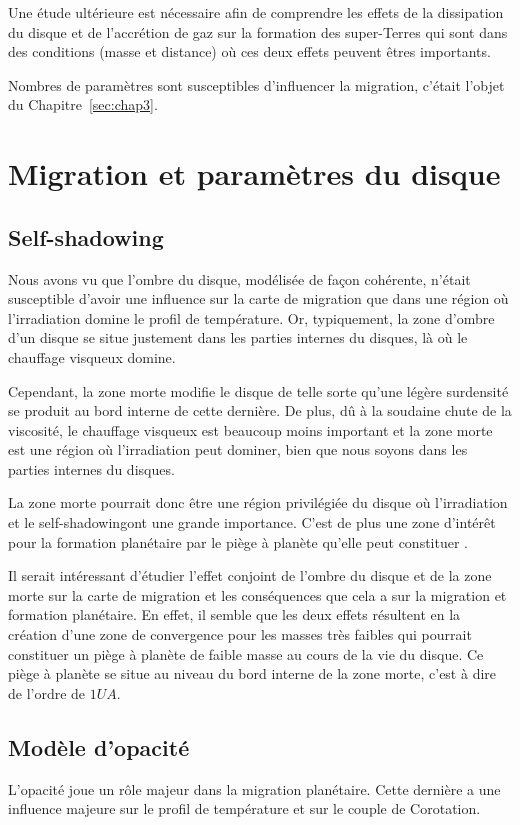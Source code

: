 Une étude ultérieure est nécessaire afin de comprendre les effets de la dissipation du disque et de l'accrétion de gaz sur la formation des super-Terres qui sont dans des conditions (masse et distance) où ces deux effets peuvent êtres importants.

Nombres de paramètres sont susceptibles d'influencer la migration, c'était l'objet du Chapitre~\ref{sec:chap3}.

\section{Migration et paramètres du disque}
\subsection{Self-shadowing}
Nous avons vu  que l'ombre du disque, modélisée de façon cohérente, n'était susceptible d'avoir une influence sur la carte de migration que dans une région où l'irradiation domine le profil de température. Or, typiquement, la zone d'ombre d'un disque se situe justement dans les parties internes du disques, là où le chauffage visqueux domine. 

Cependant, la zone morte modifie le disque de telle sorte qu'une légère surdensité se produit au bord interne de cette dernière. De plus, dû à la soudaine chute de la viscosité, le chauffage visqueux est beaucoup moins important et la zone morte est une région où l'irradiation peut dominer, bien que nous soyons dans les parties internes du disques. 

La zone morte pourrait donc être une région privilégiée du disque où l'irradiation et le \og self-shadowing\fg ont une grande importance. C'est de plus une zone d'intérêt pour la formation planétaire par le piège à planète qu'elle peut constituer \citep{hasegawa2011origin}.

Il serait intéressant d'étudier l'effet conjoint de l'ombre du disque et de la zone morte sur la carte de migration et les conséquences que cela a sur la migration et formation planétaire. En effet, il semble que les deux effets résultent en la création d'une zone de convergence pour les masses très faibles  qui pourrait constituer un piège à planète de faible masse au cours de la vie du disque. Ce piège à planète se situe au niveau du bord interne de la zone morte, c'est à dire de l'ordre de $1\unit{UA}$.

\subsection{Modèle d'opacité}
L'opacité joue un rôle majeur dans la migration planétaire. Cette dernière a une influence majeure sur le profil de température et sur le couple de Corotation. 

